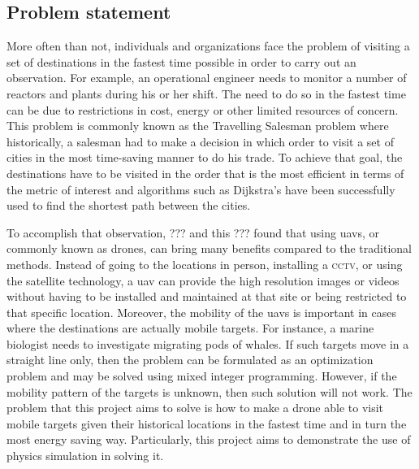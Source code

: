 \documentclass[../main.tex]{subfiles}
\begin{document}
\subsection{Problem statement}

More often than not, individuals and organizations face the problem
of visiting a set of destinations in the fastest time possible
in order to carry out an observation.
For example, an operational engineer needs to monitor
a number of reactors and plants during his or her shift.
The need to do so in the fastest time can be due to restrictions in
cost, energy or other limited resources of concern.
This problem is commonly known as the Travelling Salesman problem
where historically, a salesman had to make a decision in which order
to visit a set of cities in the most time-saving manner to do his trade.
To achieve that goal, the destinations have to be visited in the order
that is the most efficient in terms of the metric of interest
and algorithms such as Dijkstra's have been successfully used 
to find the shortest path between the cities.

To accomplish that observation, ??? and this ???
found that using \glspl{uav}, or commonly known as drones,
can bring many benefits 
compared to the traditional methods.
Instead of going to the locations in person, installing a \textsc{cctv},
or using the satellite technology, a \gls{uav} can provide
the high resolution images or videos without 
having to be installed and maintained at that site
or being restricted to that specific location.
Moreover, the mobility of the \glspl{uav} is important
in cases where the destinations are actually mobile targets.
For instance, a marine biologist needs to investigate 
migrating pods of whales.
If such targets move in a straight line only,
then the problem can be formulated as an optimization problem
and may be solved using mixed integer programming.
However, if the mobility pattern of the targets is unknown,
then such solution will not work.
The problem that this project aims to solve is 
how to make a drone able to visit mobile targets 
given their historical locations in the fastest time
and in turn the most energy saving way. 
Particularly, this project aims to demonstrate the 
use of physics simulation in solving it. 
\end{document}
